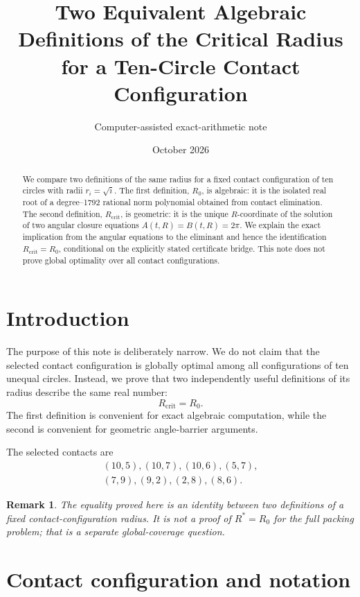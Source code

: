 \documentclass[11pt,a4paper]{article}
\title{Two Equivalent Algebraic Definitions of the Critical Radius\\
for a Ten-Circle Contact Configuration}
\author{Computer-assisted exact-arithmetic note}
\date{October 2026}
\newtheorem{remark}[theorem]{Remark}
\begin{document}
\maketitle

\begin{abstract}
We compare two definitions of the same radius for a fixed contact
configuration of ten circles with radii $r_i=\sqrt{i}$.  The first definition,
$R_0$, is algebraic: it is the isolated real root of a degree--1792 rational
norm polynomial obtained from contact elimination.  The second definition,
$R_{\mathrm{crit}}$, is geometric: it is the unique $R$-coordinate of the
solution of two angular closure equations $A(t,R)=B(t,R)=2\pi$.  We explain
the exact implication from the angular equations to the eliminant and hence
the identification $R_{\mathrm{crit}}=R_0$, conditional on the explicitly
stated certificate bridge.  This note does not prove global
optimality over all contact configurations.
\end{abstract}

\tableofcontents

\section{Introduction}

The purpose of this note is deliberately narrow.  We do not claim that the
selected contact configuration is globally optimal among all configurations
of ten unequal circles.  Instead, we prove that two independently useful
definitions of its radius describe the same real number:
\[
  \boxed{R_{\mathrm{crit}}=R_0}.
\]
The first definition is convenient for exact algebraic computation, while the
second is convenient for geometric angle-barrier arguments.

The selected contacts are
\[
\begin{gathered}
(10,5),(10,7),(10,6),(5,7),\\
(7,9),(9,2),(2,8),(8,6).
\end{gathered}
\]

\begin{remark}
The equality proved here is an identity between two definitions of a fixed
contact-configuration radius.  It is not a proof of $R^*=R_0$ for the full
packing problem; that is a separate global-coverage question.
\end{remark}

\section{Contact configuration and notation}
\end{document}
